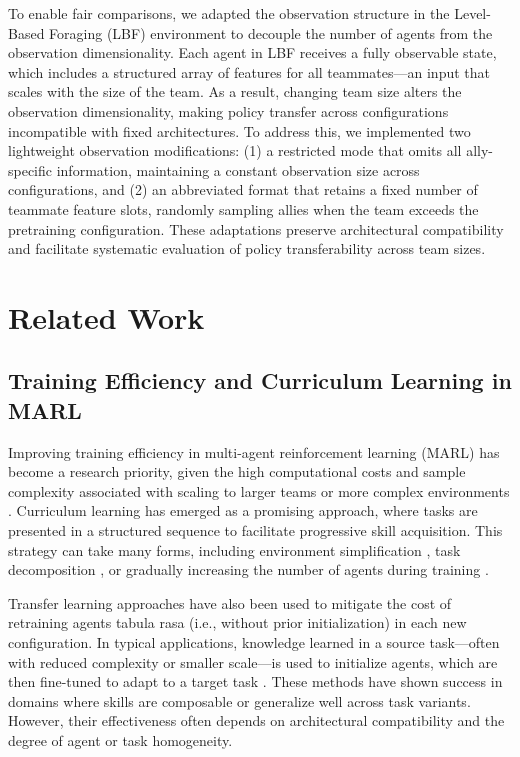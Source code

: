 \documentclass{article}
\begin{document}
To enable fair comparisons, we adapted the observation structure in the Level-Based Foraging (LBF) 
environment to decouple the number of agents from the observation dimensionality. 
Each agent in LBF receives a fully observable state, which includes a structured array of 
features for all teammates—an input that scales with the size of the team. As a result, changing 
team size alters the observation dimensionality, making policy transfer across configurations 
incompatible with fixed architectures. To address this, we implemented two lightweight 
observation modifications: (1) a restricted mode that omits all ally-specific information, 
maintaining a constant observation size across configurations, 
and (2) an abbreviated format that retains a fixed number of teammate feature slots, 
randomly sampling allies when the team exceeds the pretraining configuration. 
These adaptations preserve architectural compatibility and facilitate systematic 
evaluation of policy transferability across team sizes.


\section{Related Work}

\subsection{Training Efficiency and Curriculum Learning in MARL}

Improving training efficiency in multi-agent reinforcement learning (MARL) has become a research 
priority, given the high computational costs and sample complexity associated with scaling to 
larger teams or more complex environments \cite{shoham2007a, busoniu2008, zhang2021, nguyen2020}. 
Curriculum learning has emerged as a promising approach, where tasks are presented in a structured 
sequence to facilitate progressive skill acquisition. This strategy can take many forms, 
including environment simplification \cite{shukla2022}, task decomposition \cite{shi2023}, 
or gradually increasing the number of agents during training \cite{smit2023, albrecht2024}.

Transfer learning approaches have also been used to mitigate the cost of retraining agents 
tabula rasa (i.e., without prior initialization) in each new configuration. 
In typical applications, knowledge learned in a source task—often with reduced 
complexity or smaller scale—is used to initialize agents, 
which are then fine-tuned to adapt to a target task \cite{cui2022}. 
These methods have shown success in domains where skills are composable 
or generalize well across task variants. However, their effectiveness often 
depends on architectural compatibility and the degree of agent or task homogeneity.
\end{document}
